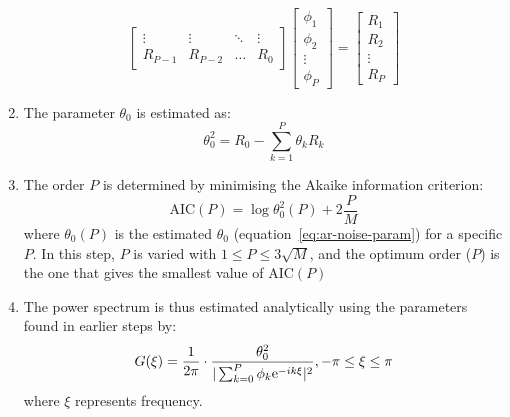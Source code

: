 \begin{enumerate}
\begin{equation}
\begin{bmatrix}
            \vdots & \vdots & \ddots & \vdots \\
            R_{P-1} & R_{P-2} & \dots & R_{0}
          \end{bmatrix}
          \begin{bmatrix}
            \phi_{1} \\
            \phi_{2} \\
            \vdots \\
            \phi_{P}
          \end{bmatrix}
          =
          \begin{bmatrix}
            R_{1} \\
            R_{2} \\
            \vdots \\
            R_{P}
          \end{bmatrix}
        \end{equation}
  \item The parameter $\theta_{0}$ is estimated as:
        \begin{equation}
          \label{eq:ar-noise-param}
          \theta_{0}^{2} = R_{0} - \sum_{k=1}^{P}\theta_{k}R_{k}
        \end{equation}
  \item The order $P$ is determined by minimising the Akaike information criterion:
        \begin{equation}
          \label{eq:ar-aic}
          \mathrm{AIC}(P) = \log \theta_{0}^{2}(P) + 2 \frac{P}{M}
        \end{equation}
        where $\theta_{0}(P)$ is the estimated $\theta_{0}$ (equation~\ref{eq:ar-noise-param}) for a specific $P$.
        In this step, $P$ is varied with $1 \leq P \leq 3 \sqrt{M}$, and the optimum order ($P$) is the one that gives the smallest value of $\mathrm{AIC}(P)$
   \item The power spectrum is thus estimated analytically using the parameters found in earlier steps by:
        \begin{equation}
          \label{eq:ar-power-spectrum}
          G(\xi) = \frac{1}{2 \pi} \cdot \frac{\theta_{0}^{2}}{|\sum_{k=0}^{P}\phi_{k}\mathrm{e}^{-ik\xi}|^{2}}, -\pi \leq \xi \leq \pi
        \end{equation}
        where $\xi$ represents frequency.
\end{enumerate}

